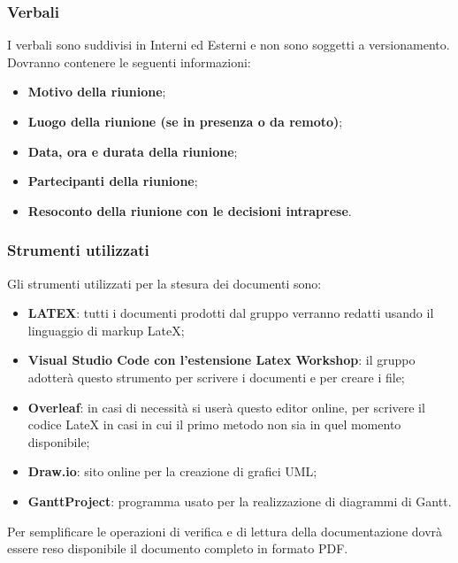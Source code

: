 \subsubsection{Verbali}
I verbali sono suddivisi in Interni ed Esterni e non sono soggetti a versionamento. \\
Dovranno contenere le seguenti informazioni:
\begin{itemize}
    \item \textbf{Motivo della riunione};
    \item \textbf{Luogo della riunione (se in presenza o da remoto)};
    \item \textbf{Data, ora e durata della riunione};
    \item \textbf{Partecipanti della riunione};
    \item \textbf{Resoconto della riunione con le decisioni intraprese}.
\end{itemize}

\subsubsection{Strumenti utilizzati}
Gli strumenti utilizzati per la stesura dei documenti sono:
\begin{itemize}
    \item \textbf{LATEX}: tutti i documenti prodotti dal gruppo verranno redatti usando il linguaggio di markup LateX;
    \item \textbf{Visual Studio Code con l’estensione Latex Workshop}: il gruppo adotterà questo strumento per scrivere i documenti e per creare i file;
    \item \textbf{Overleaf}: in casi di necessità si userà questo editor online, per scrivere il codice LateX in casi in cui il primo metodo non sia in quel momento disponibile;
    \item \textbf{Draw.io}: sito online per la creazione di grafici UML;
    \item \textbf{GanttProject}: programma usato per la realizzazione di diagrammi di Gantt.
\end{itemize}
Per semplificare le operazioni di verifica e di lettura della documentazione dovrà essere reso disponibile il documento completo in formato PDF.

